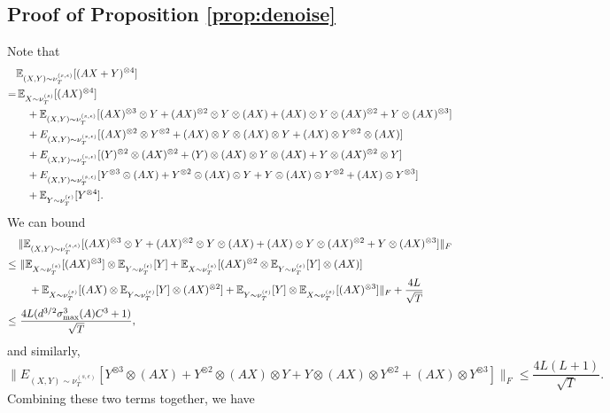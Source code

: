\subsection{Proof of Proposition \ref{prop:denoise}} 
Note that 
\begin{align*}
& \mathbb{E}_{(X,Y)\sim \nu_T^{(s,\epsilon)}} [(AX+Y)^{\otimes 4}]\\
 = & \,\mathbb{E}_{X\sim \nu_T^{(s)}}[(AX)^{\otimes 4}] \\
& \quad+ \mathbb{E}_{(X,Y)\sim \nu_T^{(s,\epsilon)}} [(AX)^{\otimes 3}\otimes Y + (AX)^{\otimes 2}\otimes Y\otimes (AX) + (AX)\otimes Y\otimes (AX)^{\otimes 2} + Y\otimes (AX)^{\otimes 3}] \\
& \quad+ E_{(X,Y)\sim \nu_T^{(s,\epsilon)}} [ (AX)^{\otimes 2}\otimes Y^{\otimes 2} + (AX)\otimes Y\otimes (AX)\otimes Y + (AX)\otimes Y^{\otimes 2}\otimes (AX)]\\
& \quad+  E_{(X,Y)\sim \nu_T^{(s,\epsilon)}} [ (Y)^{\otimes 2}\otimes (AX)^{\otimes 2} + (Y)\otimes (AX)\otimes Y\otimes (AX) + Y\otimes (AX)^{\otimes 2}\otimes Y] \\
& \quad+ E_{(X,Y)\sim \nu_T^{(s,\epsilon)}} [Y^{\otimes 3}\otimes (AX) + Y^{\otimes 2}\otimes (AX)\otimes Y + Y\otimes (AX)\otimes Y^{\otimes 2} + (AX)\otimes Y^{\otimes 3}] \\
& \quad+ \mathbb{E}_{Y\sim \nu_T^{(\epsilon)}}[Y^{\otimes 4}].
\end{align*}
We can bound
\begin{align*}
& \| \mathbb{E}_{(X,Y)\sim \nu_T^{(s,\epsilon)}} [(AX)^{\otimes 3}\otimes Y + (AX)^{\otimes 2}\otimes Y\otimes (AX) + (AX)\otimes Y\otimes (AX)^{\otimes 2} + Y\otimes (AX)^{\otimes 3}] \|_F \\
\le \,& \,  \| \mathbb{E}_{X\sim \nu_T^{(s)}} [(AX)^{\otimes 3}] \otimes \mathbb{E}_{Y\sim \nu_T^{(\epsilon)}}[Y] + \mathbb{E}_{X\sim \nu_T^{(s)}} [(AX)^{\otimes 2} \otimes \mathbb{E}_{Y\sim \nu_T^{(\epsilon)}}[Y] \otimes (AX)] \\
& \quad + \mathbb{E}_{X\sim \nu_T^{(s)}} [(AX) \otimes \mathbb{E}_{Y\sim \nu_T^{(\epsilon)}}[Y] \otimes (AX)^{\otimes 2}]  + \mathbb{E}_{Y\sim \nu_T^{(\epsilon)}}[Y] \otimes \mathbb{E}_{X\sim \nu_T^{(s)}} [(AX)^{\otimes 3}] \|_F + \frac{4L}{\sqrt{T}} \\
\le \, & \,\frac{4L(d^{3/2}\sigma^3_{\max}(A)C^3 +1)}{\sqrt{T}},
\end{align*}
and similarly, 
\[
\| E_{(X,Y)\sim \nu_T^{(s,\epsilon)}} [Y^{\otimes 3}\otimes (AX) + Y^{\otimes 2}\otimes (AX)\otimes Y + Y\otimes (AX)\otimes Y^{\otimes 2} + (AX)\otimes Y^{\otimes 3}] \|_F \le \frac{4L(L+1)}{\sqrt{T}}.
\]
Combining these two terms together, we have 
